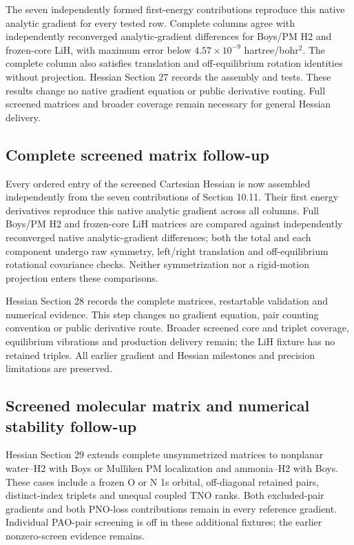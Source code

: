 \documentclass[11pt]{article}
\begin{document}
The seven independently formed first-energy contributions reproduce this
native analytic gradient for every tested row. Complete columns agree
with independently reconverged analytic-gradient differences for Boys/PM
H2 and frozen-core LiH, with maximum error below
$4.57\times10^{-9}$ hartree/bohr$^2$. The complete column also satisfies
translation and off-equilibrium rotation identities without projection.
Hessian Section 27 records the assembly and tests. These results change no
native gradient equation or public derivative routing. Full screened
matrices and broader coverage remain necessary for general Hessian delivery.
\subsection{Complete screened matrix follow-up}
Every ordered entry of the screened Cartesian Hessian is now assembled
independently from the seven contributions of Section 10.11. Their first
energy derivatives reproduce this native analytic gradient across all
columns. Full Boys/PM H2 and frozen-core LiH matrices are compared against
independently reconverged native analytic-gradient differences; both the
total and each component undergo raw symmetry, left/right translation
and off-equilibrium rotational covariance checks. Neither symmetrization
nor a rigid-motion projection enters these comparisons.

Hessian Section 28 records the complete matrices, restartable validation
and numerical evidence. This step changes no gradient equation, pair
counting convention or public derivative route. Broader screened core and
triplet coverage, equilibrium vibrations and production delivery remain;
the LiH fixture has no retained triples. All earlier gradient and Hessian
milestones and precision limitations are preserved.

\subsection{Screened molecular matrix and numerical stability follow-up}
Hessian Section 29 extends complete unsymmetrized matrices to nonplanar
water--H2 with Boys or Mulliken PM localization and ammonia--H2 with Boys.
These cases include a frozen O or N 1s orbital,
off-diagonal retained pairs, distinct-index triplets and unequal coupled
TNO ranks. Both excluded-pair gradients and both PNO-loss contributions
remain in every reference gradient. Individual PAO-pair screening is off
in these additional fixtures; the earlier nonzero-screen evidence remains.
\end{document}
